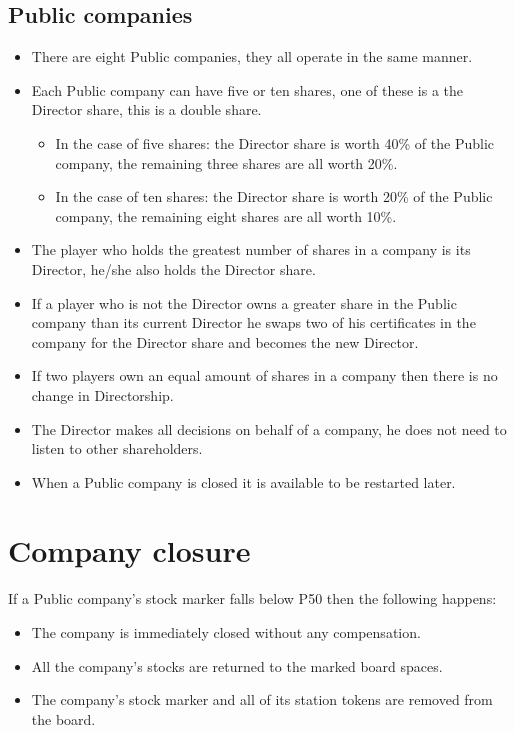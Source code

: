 \documentclass[a4paper,twocolumn]{article}
\begin{document}
\subsection{Public companies}
\begin{itemize}
	\item There are eight Public companies, they all operate in the same manner.
	\item Each Public company can have five or ten shares, one of these is a
	the Director share, this is a double share.
	\begin{itemize}
		\item In the case of five shares: the Director share is worth 40\% of
		the Public company, the remaining three shares are all worth 20\%.
		\item In the case of ten shares: the Director share is worth 20\% of
		the Public company, the remaining eight shares are all worth 10\%.
	\end{itemize}
	\item The player who holds the greatest number of shares in a company is its
	Director, he/she also holds the Director share.
	\item If a player who is not the Director owns a greater share in the Public
	company than its current Director he swaps two of his certificates in the
	company for the Director share and becomes the new Director.
	\item If two players own an equal amount of shares in a company then there
	is no change in Directorship.
	\item The Director makes all decisions on behalf of a company, he does not
	need to listen to other shareholders.
	\item When a Public company is closed it is available to be restarted later.
\end{itemize}

\section{Company closure}
If a Public company's stock marker falls below P50 then the following happens:
\begin{itemize}
	\item The company is immediately closed without any compensation.
	\item All the company's stocks are returned to the marked board spaces.
	\item The company's stock marker and all of its station tokens are removed
	from the board.
\end{itemize}
\end{document}
